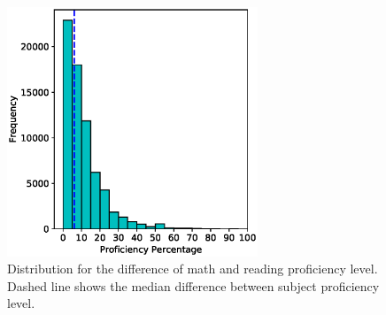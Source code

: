 \begin{figure} 
	\includegraphics[width=7.5cm]{images/prof_diff}
	\caption{Distribution for the difference of math and reading proficiency level. Dashed line shows the median difference between subject proficiency level.}
	\label{fig:diff}
\end{figure}


